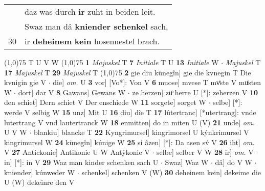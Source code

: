 \documentclass[8pt,a4paper,notitlepage]{article}
\begin{document}
\begin{table}[ht]
\begin{minipage}[t]{0.5\linewidth}
\begin{tabular}{rl}
 & daz was durch \textbf{ir} zuht in beiden leit.\\ 
 & Swaz man dâ \textbf{kniender schenkel} sach,\\ 
30 & ir \textbf{deheinem} \textbf{kein} hosennestel brach.\\ 
\end{tabular}
\scriptsize
\line(1,0){75} \newline
T U V W \newline
\line(1,0){75} \newline
\textbf{1} \textit{Majuskel} T  \textbf{7} \textit{Initiale} T U  \textbf{13} \textit{Initiale} W   $\cdot$ \textit{Majuskel} T  \textbf{17} \textit{Majuskel} T  \textbf{29} \textit{Majuskel} T  \newline
\line(1,0){75} \newline
\textbf{2} gie diu künegîn] gie die kvnegin T Die kvnigin gie V  $\cdot$ die] \textit{om.} U \textbf{3} vor] [Vo*]: Von V \textbf{6} muose] mvese T mvͤste V muͦsten W  $\cdot$ dort] dar V \textbf{8} Gawans] Gewans W  $\cdot$ ze herzen] zuͦ herre U [*]: zeherzen V \textbf{10} den schiet] Dern schiet V Der enschiede W \textbf{11} sorgete] sorget W  $\cdot$ selbe] [*]: werde V selbig W \textbf{15} unz] Mit U \textbf{16} diu] dîe T \textbf{17} lûtertranc] [*utertrang]: vnde lutertrang V vnd lautertranck W \textbf{18} enmitten] do in miten U (V) \textbf{21} unde] \textit{om.} U V W  $\cdot$ blankiu] blancke T \textbf{22} Kyngrimursel] kingrimorsel U kẏnkrimursel V kingrimursel W \textbf{24} künegîn] kúnige W \textbf{25} si âzen] [*]: Da asen sv́ V \textbf{26} iht] \textit{om.} V \textbf{27} Antickonie] Antikonie U W Antẏkonie V  $\cdot$ selbe] selber V W \textbf{28} ir] \textit{om.} V  $\cdot$ in] [*]: in V \textbf{29} Waz man kinder schenken sach U  $\cdot$ Swaz] Waz W  $\cdot$ dâ] do V W  $\cdot$ kniender] kúnweder W  $\cdot$ schenkel] schenken V (W) \textbf{30} deheinem kein] dekeime die U (W) dekeinre den V \newline
\end{minipage}
\end{table}
\end{document}
